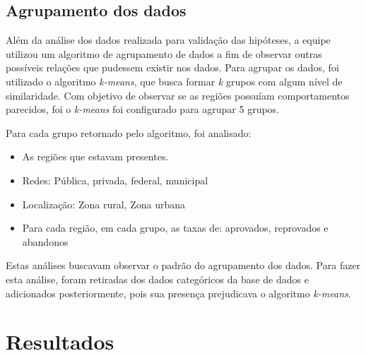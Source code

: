 \documentclass[review]{elsarticle}
\begin{document}
\subsection{Agrupamento dos dados}
Além da análise dos dados realizada para validação das hipóteses, a equipe utilizou um algoritmo de agrupamento de dados a fim de observar outras possíveis relações que pudessem existir nos dados. Para agrupar os dados, foi utilizado o algoritmo \emph{k-means}, que busca formar \emph{k} grupos com algum nível de similaridade. Com objetivo de observar se as regiões possuíam comportamentos parecidos, foi o \emph{k-means} foi configurado para agrupar 5 grupos.\par
Para cada grupo retornado pelo algoritmo, foi analisado: 
\begin{itemize}[noitemsep]
    \item As regiões que estavam presentes.
    \item Redes: {Pública, privada, federal, municipal}
    \item Localização: {Zona rural, Zona urbana}
    \item Para cada região, em cada grupo, as taxas de: aprovados, reprovados e abandonos 
\end{itemize}
Estas análises buscavam observar o padrão do agrupamento dos dados. Para fazer esta análise, foram retiradas dos dados categóricos da base de dados e adicionados posteriormente, pois sua presença prejudicava o algoritmo \emph{k-means}. 

\section{Resultados}
\end{document}
